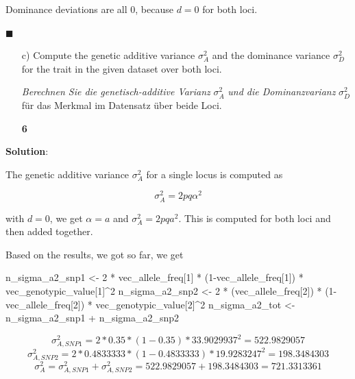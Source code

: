 \documentclass[
]{article}
\newenvironment{Shaded}{\begin{snugshade}}{\end{snugshade}}
\newcommand{\DecValTok}[1]{\textcolor[rgb]{0.00,0.00,0.81}{#1}}
\newcommand{\NormalTok}[1]{#1}
\newcommand{\OtherTok}[1]{\textcolor[rgb]{0.56,0.35,0.01}{#1}}
\newcommand{\SpecialCharTok}[1]{\textcolor[rgb]{0.00,0.00,0.00}{#1}}
\newcommand{\points}[1]
{\begin{flushright}\textbf{#1}\end{flushright}}
\newcommand{\solstart}
{\vspace{3ex}\textbf{Solution}:}
\newcommand{\solend}
{\vspace{2ex}$\blacksquare$}
\begin{document}
Dominance deviations are all \(0\), because \(d=0\) for both loci.

\solend

\clearpage
\pagebreak

\begin{enumerate}
\item[c)]  Compute the genetic additive variance $\sigma_A^2$ and the dominance variance $\sigma_D^2$ for the trait in the given dataset over both loci.

\textit{Berechnen Sie die genetisch-additive Varianz } $\sigma_A^2$ \textit{ und die Dominanzvarianz } $\sigma_D^2$ für das Merkmal im Datensatz über beide Loci. 
\points{6}
\end{enumerate}

\solstart

The genetic additive variance \(\sigma_A^2\) for a single locus is
computed as

\[\sigma_A^2 = 2pq\alpha^2\]

with \(d=0\), we get \(\alpha = a\) and \(\sigma_A^2 = 2pqa^2\). This is
computed for both loci and then added together.

Based on the results, we got so far, we get

\begin{Shaded}
\begin{Highlighting}[]
\NormalTok{n\_sigma\_a2\_snp1 }\OtherTok{\textless{}{-}} \DecValTok{2} \SpecialCharTok{*}\NormalTok{ vec\_allele\_freq[}\DecValTok{1}\NormalTok{] }\SpecialCharTok{*}\NormalTok{ (}\DecValTok{1}\SpecialCharTok{{-}}\NormalTok{vec\_allele\_freq[}\DecValTok{1}\NormalTok{]) }\SpecialCharTok{*} 
\NormalTok{  vec\_genotypic\_value[}\DecValTok{1}\NormalTok{]}\SpecialCharTok{\^{}}\DecValTok{2}
\NormalTok{n\_sigma\_a2\_snp2 }\OtherTok{\textless{}{-}} \DecValTok{2} \SpecialCharTok{*}\NormalTok{ (vec\_allele\_freq[}\DecValTok{2}\NormalTok{]) }\SpecialCharTok{*}\NormalTok{ (}\DecValTok{1}\SpecialCharTok{{-}}\NormalTok{vec\_allele\_freq[}\DecValTok{2}\NormalTok{]) }\SpecialCharTok{*} 
\NormalTok{  vec\_genotypic\_value[}\DecValTok{2}\NormalTok{]}\SpecialCharTok{\^{}}\DecValTok{2}
\NormalTok{n\_sigma\_a2\_tot }\OtherTok{\textless{}{-}}\NormalTok{ n\_sigma\_a2\_snp1 }\SpecialCharTok{+}\NormalTok{ n\_sigma\_a2\_snp2}
\end{Highlighting}
\end{Shaded}

\[\sigma_{A,SNP1}^2 = 2 * 0.35 * (1 - 0.35) * 33.9029937^2 = 522.9829057\]
\[\sigma_{A,SNP2}^2 = 2 * 0.4833333 * (1 - 0.4833333) * 19.9283247^2 = 198.3484303\]
\[\sigma_A^2 = \sigma_{A,SNP1}^2 + \sigma_{A,SNP2}^2 = 522.9829057 + 198.3484303 = 721.3313361\]
\end{document}
